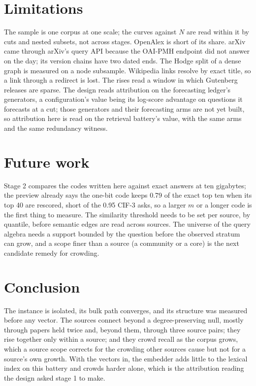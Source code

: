 \documentclass[11pt]{article}
\theoremstyle{plain}
\theoremstyle{definition}
\theoremstyle{remark}
\begin{document}
\section{Limitations}
The sample is one corpus at one scale; the curves against $N$ are read within it by cuts and nested
subsets, not across stages. OpenAlex is short of its share. arXiv came through arXiv's query API
because the OAI-PMH endpoint did not answer on the day; its version chains have two dated ends. The
Hodge split of a dense graph is measured on a node subsample. Wikipedia links resolve by exact title,
so a link through a redirect is lost. The rises read a window in which Gutenberg releases are sparse.
The design reads attribution on the forecasting ledger's generators, a configuration's value being
its log-score advantage on questions it forecasts at a cut; those generators and their forecasting
arms are not yet built, so attribution here is read on the retrieval battery's value, with the same
arms and the same redundancy witness.

\section{Future work}
Stage 2 compares the codes written here against exact answers at ten gigabytes; the preview already
says the one-bit code keeps 0.79 of the exact top ten when its top 40 are rescored, short of the 0.95
CIF-3 asks, so a larger $m$ or a longer code is the first thing to measure. The similarity threshold
needs to be set per source, by quantile, before semantic edges are read across sources. The universe
of the query algebra needs a support bounded by the question before the observed stratum can grow, and
a scope finer than a source (a community or a core) is the next candidate remedy for crowding.

\section{Conclusion}
The instance is isolated, its bulk path converges, and its structure was measured before any vector.
The sources connect beyond a degree-preserving null, mostly through papers held twice and, beyond
them, through three source pairs; they rise together only within a source; and they crowd recall as
the corpus grows, which a source scope corrects for the crowding other sources cause but not for a
source's own growth. With the vectors in, the embedder adds little to the lexical index on this
battery and crowds harder alone, which is the attribution reading the design asked stage 1 to make.



\end{document}
